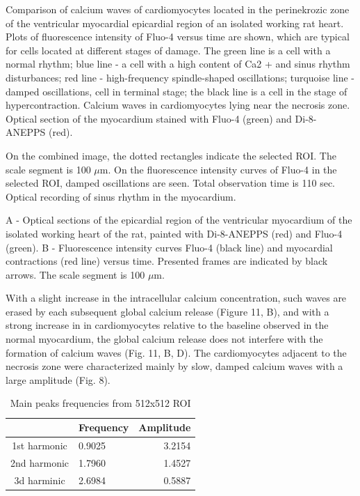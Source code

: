 \documentclass{biophys-new}
\begin{document}
Comparison of calcium waves of cardiomyocytes located in the perinekrozic zone of the ventricular myocardial epicardial region of an isolated working rat heart.
Plots of fluorescence intensity of Fluo-4 versus time are shown, which are typical for cells located at different stages of damage.
The green line is a cell with a normal rhythm; blue line - a cell with a high content of Ca2 + and sinus rhythm disturbances; red line - high-frequency spindle-shaped oscillations; turquoise line - damped oscillations, cell in terminal stage; the black line is a cell in the stage of hypercontraction.
Calcium waves in cardiomyocytes lying near the necrosis zone.
Optical section of the myocardium stained with Fluo-4 (green) and Di-8-ANEPPS (red).



On the combined image, the dotted rectangles indicate the selected ROI.
The scale segment is 100 $\mu$m.
On the fluorescence intensity curves of Fluo-4 in the selected ROI, damped oscillations are seen.
Total observation time is 110 sec.
Optical recording of sinus rhythm in the myocardium.




A - Optical sections of the epicardial region of the ventricular myocardium of the isolated working heart of the rat, painted with Di-8-ANEPPS (red) and Fluo-4 (green). B - Fluorescence intensity curves Fluo-4 (black line) and myocardial contractions (red line) versus time. Presented frames are indicated by black arrows.
The scale segment is 100 $\mu$m.




 With a slight increase in the intracellular calcium concentration, such waves are erased by each subsequent global calcium release (Figure 11, B), and with a strong increase in  in cardiomyocytes relative to the baseline observed in the normal myocardium, the global calcium release does not interfere with the formation of calcium waves (Fig. 11, B, D).
 The cardiomyocytes adjacent to the necrosis zone were characterized mainly by slow, damped calcium waves with a large amplitude (Fig. 8).

 \begin{table}[hb!]
 \caption{Main peaks frequencies from 512x512 ROI}
 \label{tab:freq}
 \centering
 \begin{threeparttable}
 \begin{tabular}{c l r}
 \hline
  & Frequency & Amplitude  \\\hline
 1st harmonic & 0.9025 & 3.2154 \\
 2nd harmonic & 1.7960 & 1.4527  \\
 3d harminic & 2.6984 & 0.5887    \\
 \hline
 \end{tabular}
 \end{threeparttable}
 \end{table}
\end{document}
